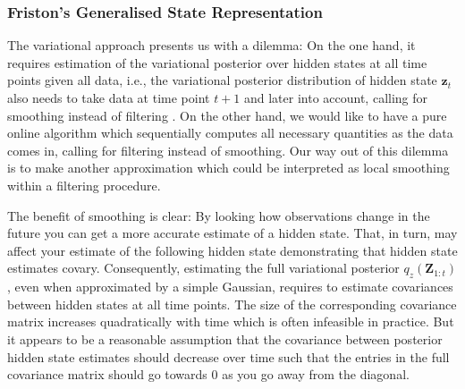 \documentclass[a4paper,10pt]{article}
\newcommand{\bs}[1]{\mathbf{#1}}					%
\renewcommand{\ss}{z}         %
\newcommand{\ps}{\bs{\ss}}    %
\newcommand{\Ps}{\bs{Z}}    %
\begin{document}
\subsubsection{Friston's Generalised State Representation}
The variational approach presents us with a dilemma: On the one hand, it requires estimation of the variational posterior over hidden states at all time points given all data, i.e., the variational posterior distribution of hidden state $\ps_t$ also needs to take data at time point $t+1$ and later into account, calling for smoothing instead of filtering \citep[cf.][]{Beal2003}. On the other hand, we would like to have a pure online algorithm which sequentially computes all necessary quantities as the data comes in, calling for filtering instead of smoothing. Our way out of this dilemma is to make another approximation which could be interpreted as local smoothing within a filtering procedure.

The benefit of smoothing is clear: By looking how observations change in the future you can get a more accurate estimate of a hidden state. That, in turn, may affect your estimate of the following hidden state demonstrating that hidden state estimates covary. Consequently, estimating the full variational posterior $q_{\ss}(\Ps_{1:t})$, even when approximated by a simple Gaussian, requires to estimate covariances between hidden states at all time points. The size of the corresponding covariance matrix increases quadratically with time which is often infeasible in practice. But it appears to be a reasonable assumption that the covariance between posterior hidden state estimates should decrease over time such that the entries in the full covariance matrix should go towards 0 as you go away from the diagonal. 
\end{document}
